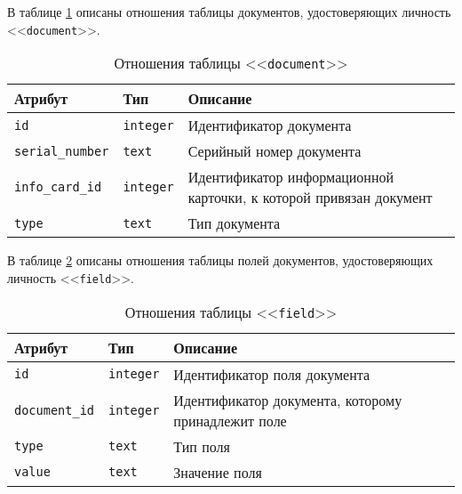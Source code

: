 В таблице \ref{table:documentCols} описаны отношения таблицы документов, удостоверяющих личность <<\texttt{document}>>.
\begin{table}[h!]
	\begin{center}
		\caption{\label{table:documentCols} Отношения таблицы <<\texttt{document}>>}
		\begin{tabularx}{\textwidth}{|X|X|X|}
			\hline
			Атрибут & Тип & Описание \\ \hline
			\texttt{id} & \texttt{integer} & Идентификатор документа \\ \hline
			\texttt{serial\_number} & \texttt{text} & Серийный номер документа \\ \hline
			\texttt{info\_card\_id} & \texttt{integer} & Идентификатор информационной карточки, к которой привязан документ \\ \hline
			\texttt{type} & \texttt{text} & Тип документа \\ \hline
		\end{tabularx}
	\end{center}
\end{table}

\clearpage

В таблице \ref{table:fieldCols} описаны отношения таблицы полей документов, удостоверяющих личность <<\texttt{field}>>.
\begin{table}[h!]
	\begin{center}
		\caption{\label{table:fieldCols} Отношения таблицы <<\texttt{field}>>}
		\begin{tabularx}{\textwidth}{|X|X|X|}
			\hline
			Атрибут & Тип & Описание \\ \hline
			\texttt{id} & \texttt{integer} & Идентификатор поля документа \\ \hline
			\texttt{document\_id} & \texttt{integer} & Идентификатор документа, которому принадлежит поле \\ \hline
			\texttt{type} & \texttt{text} & Тип поля \\ \hline
			\texttt{value} & \texttt{text} & Значение поля \\ \hline
		\end{tabularx}
	\end{center}
\end{table}

